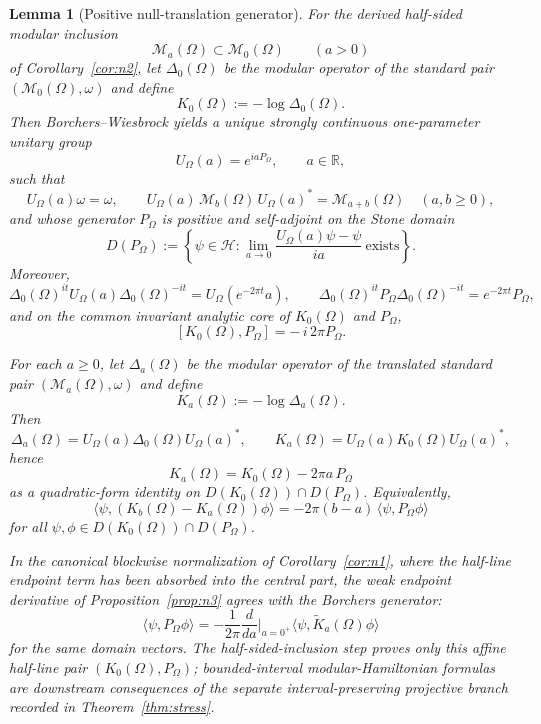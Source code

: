 \documentclass[11pt]{article}
\newtheorem{lemma}[theorem]{Lemma}
\begin{document}
\begin{lemma}[Positive null-translation generator]\label{lem:translation}
For the derived half-sided modular inclusion
\[
\mathcal M_a(\Omega)\subset \mathcal M_0(\Omega)
\qquad (a>0)
\]
of Corollary~\ref{cor:n2}, let \(\Delta_0(\Omega)\) be the modular operator of the standard pair \((\mathcal M_0(\Omega),\omega)\) and define
\[
K_0(\Omega):=-\log \Delta_0(\Omega).
\]
Then Borchers--Wiesbrock yields a unique strongly continuous one-parameter unitary group
\[
U_\Omega(a)=e^{iaP_\Omega},
\qquad a\in\mathbb R,
\]
such that
\[
U_\Omega(a)\omega=\omega,
\qquad
U_\Omega(a)\,\mathcal M_b(\Omega)\,U_\Omega(a)^*=\mathcal M_{a+b}(\Omega)
\quad (a,b\ge 0),
\]
and whose generator \(P_\Omega\) is positive and self-adjoint on the Stone domain
\[
D(P_\Omega)
:=
\left\{
\psi\in\mathcal H:
\lim_{a\to 0}\frac{U_\Omega(a)\psi-\psi}{ia}\ \text{exists}
\right\}.
\]
Moreover,
\[
\Delta_0(\Omega)^{it}U_\Omega(a)\Delta_0(\Omega)^{-it}
=
U_\Omega(e^{-2\pi t}a),
\qquad
\Delta_0(\Omega)^{it}P_\Omega\Delta_0(\Omega)^{-it}
=
e^{-2\pi t}P_\Omega,
\]
and on the common invariant analytic core of \(K_0(\Omega)\) and \(P_\Omega\),
\[
[K_0(\Omega),P_\Omega]=-\,i\,2\pi P_\Omega.
\]

For each \(a\ge 0\), let \(\Delta_a(\Omega)\) be the modular operator of the translated standard pair \((\mathcal M_a(\Omega),\omega)\) and define
\[
K_a(\Omega):=-\log \Delta_a(\Omega).
\]
Then
\[
\Delta_a(\Omega)=U_\Omega(a)\Delta_0(\Omega)U_\Omega(a)^*,
\qquad
K_a(\Omega)=U_\Omega(a)K_0(\Omega)U_\Omega(a)^*,
\]
hence
\[
K_a(\Omega)=K_0(\Omega)-2\pi a\,P_\Omega
\]
as a quadratic-form identity on \(D(K_0(\Omega))\cap D(P_\Omega)\). Equivalently,
\[
\langle\psi,(K_b(\Omega)-K_a(\Omega))\phi\rangle
=
-2\pi(b-a)\,\langle\psi,P_\Omega\phi\rangle
\]
for all \(\psi,\phi\in D(K_0(\Omega))\cap D(P_\Omega)\).

In the canonical blockwise normalization of Corollary~\ref{cor:n1}, where the half-line endpoint term has been absorbed into the central part, the weak endpoint derivative of Proposition~\ref{prop:n3} agrees with the Borchers generator:
\[
\langle\psi,P_\Omega\phi\rangle
=
-\frac{1}{2\pi}\frac{d}{da}\Big|_{a=0^+}
\langle\psi,\widetilde K_a(\Omega)\phi\rangle
\]
for the same domain vectors. The half-sided-inclusion step proves only this affine half-line pair \((K_0(\Omega),P_\Omega)\); bounded-interval modular-Hamiltonian formulas are downstream consequences of the separate interval-preserving projective branch recorded in Theorem~\ref{thm:stress}.
\end{lemma}
\end{document}
